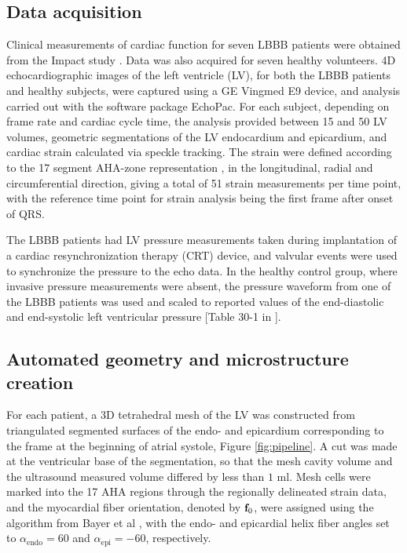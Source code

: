 \subsection{Data acquisition}
\label{sec:clinical_data}

Clinical measurements of cardiac function for seven LBBB patients were
obtained from the Impact study \cite{ImpactStudy2016}.
Data was also acquired for seven healthy volunteers. 4D echocardiographic
images of the left ventricle (LV), for both the LBBB patients and
healthy subjects, were captured using
a GE Vingmed E9 device, and analysis carried out with the
software package EchoPac. For each subject, depending on frame rate and cardiac cycle time, the
analysis provided between 15 and 50 LV volumes,  geometric segmentations of the LV
endocardium and epicardium, and cardiac strain calculated via speckle
tracking. The strain were defined according to
the 17 segment AHA-zone representation
\cite{cerqueira2002standardized}, in the longitudinal, radial and
circumferential direction, giving a total of 51 strain measurements
per time point, with the reference time point for strain analysis
  being the first frame after onset of QRS.

The LBBB patients had LV pressure measurements taken during
implantation of a cardiac resynchronization therapy (CRT) device, and
valvular events were used to synchronize the pressure to the echo
data. In the healthy control group, where invasive pressure measurements were
absent, the pressure waveform from one of the LBBB patients was used and
scaled to reported values of the end-diastolic and end-systolic
left ventricular pressure [Table 30-1 in \cite{klingensmith2008washington}].


\subsection{Automated geometry and microstructure creation}
For each patient, a 3D tetrahedral mesh of the LV was
constructed from triangulated segmented surfaces of the endo- and
epicardium corresponding to the frame at the beginning of
atrial systole, Figure \ref{fig:pipeline}. A cut was made at the
ventricular base of the segmentation, so that the mesh cavity volume
and the ultrasound measured volume differed by less than  $1$ ml. Mesh
cells were marked into the 17 AHA regions through the regionally
delineated strain data, and the myocardial fiber orientation, denoted
by $\mathbf{f}_0$, were assigned using the algorithm from Bayer et al \cite{bayer2012novel},
with the endo- and epicardial helix fiber angles set to
$\alpha_{\text{endo}} = 60$ and $\alpha_{\text{epi}} = -60$, respectively.

